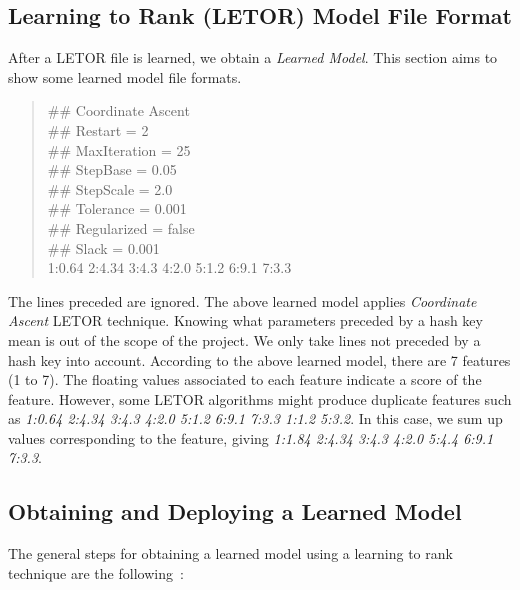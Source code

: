 \subsection{Learning to Rank (LETOR) Model File Format}
After a LETOR file is learned, we obtain a \textit{Learned Model}. This section aims to show some learned model file formats.
\begin{quotation}
\noindent \#\# Coordinate Ascent \\
\#\# Restart = 2 \\
\#\# MaxIteration = 25 \\
\#\# StepBase = 0.05 \\
\#\# StepScale = 2.0 \\
\#\# Tolerance = 0.001 \\
\#\# Regularized = false \\
\#\# Slack = 0.001 \\
1:0.64 2:4.34 3:4.3 4:2.0 5:1.2 6:9.1 7:3.3
\end{quotation}
The lines preceded are ignored. The above learned model applies \textit{Coordinate Ascent} LETOR technique. Knowing what parameters preceded by a hash key
mean is out of the scope of the project. We only take lines not preceded by a hash key into account. According to the above learned model, there are
7 features (1 to 7). The floating values associated to each feature indicate a score of the feature. However, some LETOR algorithms might produce
duplicate features such as \textit{1:0.64 2:4.34 3:4.3 4:2.0 5:1.2 6:9.1 7:3.3 1:1.2 5:3.2}. In this case, we sum up values corresponding
to the feature, giving \textit{1:1.84 2:4.34 3:4.3 4:2.0 5:4.4 6:9.1 7:3.3}.


\subsection{Obtaining and Deploying a Learned Model} \label{sec:learnedmodel}
The general steps for obtaining a learned model using a learning to rank technique are the following~\cite[P. 4]{learningmodel}:


